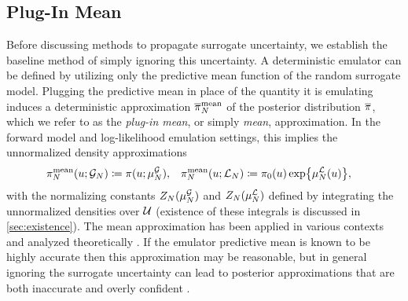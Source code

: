 \documentclass[12pt]{article}
\begin{document}
\subsection{Plug-In Mean}
Before discussing methods to propagate surrogate uncertainty, we establish the baseline method of simply 
ignoring this uncertainty. A deterministic emulator can be defined by utilizing only the predictive mean function
of the random surrogate model. Plugging the predictive mean in place of the quantity it is emulating induces 
a deterministic approximation $\postApproxNormMean[\Ndesign]$ of the posterior distribution 
$\postDensNorm$, which we refer to as the \textit{plug-in mean}, or simply \textit{mean}, approximation. 
In the forward model and log-likelihood emulation settings, this implies the unnormalized density approximations 
\begin{align}
&\postApproxMean[\Ndesign](\Par; \fwdEm[\Ndesign]) \Def \postDens(\Par; \emMean[\Ndesign]{\fwd}), \label{eq:mean-approx-fwd}
&&\postApproxMean[\Ndesign](\Par; \llikEm[\Ndesign]) \Def \priorDens(\Par) \Exp{\emMean[\Ndesign]{\llik}(\Par)}, \label{eq:mean-approx-llik}
\end{align}
with the normalizing constants $\normCstEm(\emMean[\Ndesign]{\fwd})$ and 
$\normCstEm(\emMean[\Ndesign]{\llik})$ defined by integrating the unnormalized densities over $\parSpace$
(existence of these integrals is discussed in \cref{sec:existence}).
The mean approximation has been applied in various contexts
\citep{VehtariParallelGP,trainDynamics,emPostDens,BurknerSurrogate,CLMBayesianCalibration,Lueckmann2018LikelihoodfreeIW} 
and analyzed theoretically 
\citep{StuartTeck1,StuartTeck2,random_fwd_models,TeckHyperpar,gp_surrogates_random_exploration}.
If the emulator predictive mean is known to be highly accurate then this approximation may be reasonable,
but in general ignoring the surrogate uncertainty can lead to posterior approximations that are 
both inaccurate and overly confident \citep{BurknerSurrogate}. 
\end{document}

